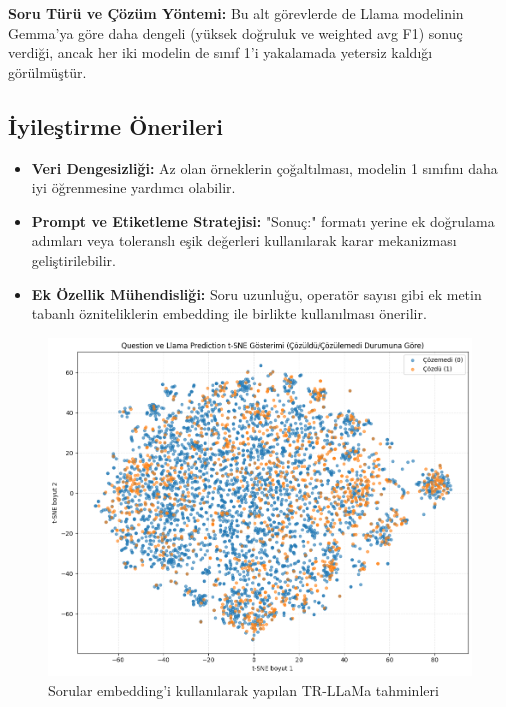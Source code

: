 \documentclass[conference]{IEEEtran}
\begin{document}
\textbf{Soru Türü ve Çözüm Yöntemi:} Bu alt görevlerde de Llama modelinin Gemma'ya göre daha dengeli (yüksek doğruluk ve weighted avg F1) sonuç verdiği, ancak her iki modelin de sınıf 1'i yakalamada yetersiz kaldığı görülmüştür.

\subsection{İyileştirme Önerileri}
\begin{itemize}
\item \textbf{Veri Dengesizliği:} Az olan örneklerin çoğaltılması, modelin 1 sınıfını daha iyi öğrenmesine yardımcı olabilir.
\item \textbf{Prompt ve Etiketleme Stratejisi:} "Sonuç:" formatı yerine ek doğrulama adımları veya toleranslı eşik değerleri kullanılarak karar mekanizması geliştirilebilir.
\item \textbf{Ek Özellik Mühendisliği:} Soru uzunluğu, operatör sayısı gibi ek metin tabanlı özniteliklerin embedding ile birlikte kullanılması önerilir.
\end{itemize}

\begin{figure}[htbp]
\centering
\includegraphics[width=1\linewidth]{q-l.png}
\caption{Sorular embedding'i kullanılarak yapılan TR-LLaMa tahminleri}
\label{fig}
\end{figure}
\end{document}

